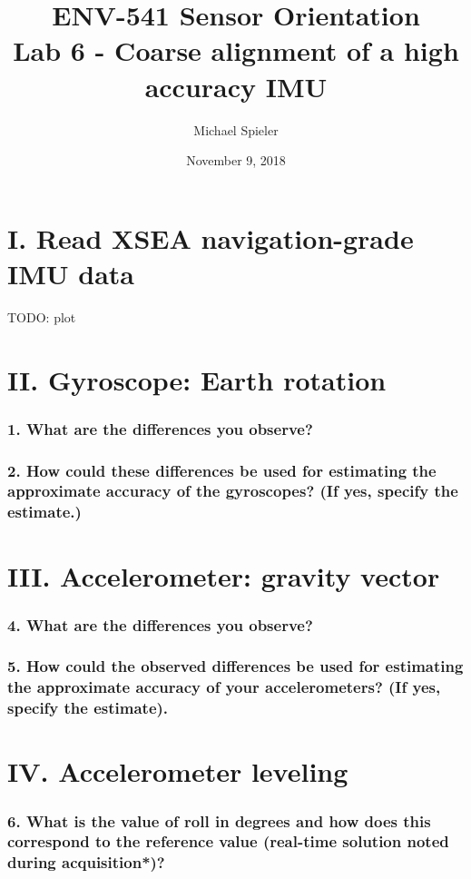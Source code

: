 \documentclass{article}
\title{ENV-541 Sensor Orientation\\Lab 6 - Coarse alignment of a high accuracy IMU}
\author{Michael Spieler}
\date{November 9, 2018}
\begin{document}
\maketitle

\section*{I. Read XSEA navigation-grade IMU data}

TODO: plot

\section*{II. Gyroscope: Earth rotation}


\subsubsection*{1. What are the differences you observe?}
\subsubsection*{2. How could these differences be used for estimating the approximate accuracy
of the gyroscopes? (If yes, specify the estimate.)}


\section*{III. Accelerometer: gravity vector}


\subsubsection*{4. What are the differences you observe?}
\subsubsection*{5. How could the observed differences be used for estimating the approximate
accuracy of your accelerometers? (If yes, specify the estimate).}


\section*{IV. Accelerometer leveling}


\subsubsection*{6. What is the value of roll in degrees and how does this correspond to the
reference value (real-time solution noted during acquisition*)?}
\end{document}
